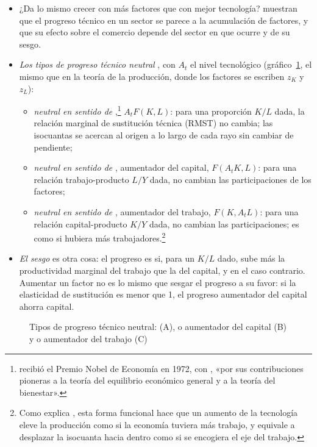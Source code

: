 \documentclass[11pt]{article}
\begin{document}
\begin{itemize}
\item ¿Da lo mismo crecer con más factores que con mejor tecnología? \textcite{FindlayGrubert1959Factor} muestran que el progreso técnico en un sector se parece a la acumulación de factores, y que su efecto sobre el comercio depende del sector en que ocurre y de su sesgo.
\item \emph{Los tipos de progreso técnico neutral} , con $A_t$ el nivel tecnológico (gráfico~\ref{fig:progreso-neutral}, el mismo que en la teoría de la producción, donde los factores se escriben $z_K$ y $z_L$):
  \begin{itemize}
  \item \emph{neutral en sentido de },\footnote{ recibió el Premio Nobel de Economía en 1972, con , «por sus contribuciones pioneras a la teoría del equilibrio económico general y a la teoría del bienestar»\nocite{Nobel1972HicksArrow}.} $A_tF(K,L)$: para una proporción $K/L$ dada, la relación marginal de sustitución técnica (RMST) no cambia; las isocuantas se acercan al origen a lo largo de cada rayo sin cambiar de pendiente;
  \item \emph{neutral en sentido de }, aumentador del capital, $F(A_tK,L)$: para una relación trabajo-producto $L/Y$ dada, no cambian las participaciones de los factores;
  \item \emph{neutral en sentido de }, aumentador del trabajo, $F(K,A_tL)$: para una relación capital-producto $K/Y$ dada, no cambian las participaciones; es como si hubiera más trabajadores.\footnote{Como explica \textcite[cap.~2]{Acemoglu2009}, esta forma funcional hace que un aumento de la tecnología eleve la producción como si la economía tuviera más trabajo, y equivale a desplazar la isocuanta hacia dentro como si se encogiera el eje del trabajo.}
  \end{itemize}
\item \emph{El sesgo}\nocite{Hicks1932Theory} es otra cosa: el progreso es  si, para un $K/L$ dado, sube más la productividad marginal del trabajo que la del capital, y  en el caso contrario. Aumentar un factor no es lo mismo que sesgar el progreso a su favor: si la elasticidad de sustitución es menor que 1, el progreso aumentador del capital ahorra capital\nocite{Acemoglu2009}.
\end{itemize}
\begin{figure}[H]
\centering
\caption{Tipos de progreso técnico neutral:  (A),  o aumentador del capital (B) y  o aumentador del trabajo (C)}\label{fig:progreso-neutral}
\end{figure}
\end{document}

